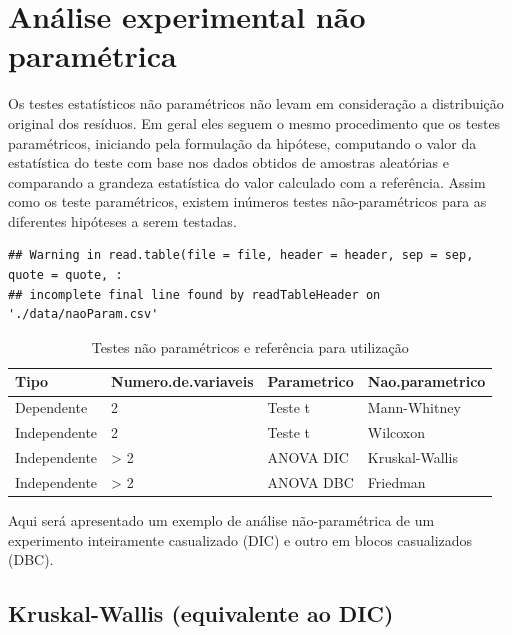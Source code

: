 \documentclass[
]{article}
\begin{document}
\hypertarget{anuxe1lise-experimental-nuxe3o-paramuxe9trica}{%
\section{Análise experimental não paramétrica}\label{anuxe1lise-experimental-nuxe3o-paramuxe9trica}}

Os testes estatísticos não paramétricos não levam em consideração a distribuição original dos resíduos. Em geral eles seguem o mesmo procedimento que os testes paramétricos, iniciando pela formulação da hipótese, computando o valor da estatística do teste com base nos dados obtidos de amostras aleatórias e comparando a grandeza estatística do valor calculado com a referência. Assim como os teste paramétricos, existem inúmeros testes não-paramétricos para as diferentes hipóteses a serem testadas.

\begin{verbatim}
## Warning in read.table(file = file, header = header, sep = sep, quote = quote, :
## incomplete final line found by readTableHeader on './data/naoParam.csv'
\end{verbatim}

\begin{table}

\caption{\label{tab:unnamed-chunk-173}Testes não paramétricos e referência para utilização}
\centering
\begin{tabular}[t]{l|l|l|l}
\hline
Tipo & Numero.de.variaveis & Parametrico & Nao.parametrico\\
\hline
Dependente & 2 & Teste t & Mann-Whitney\\
\hline
Independente & 2 & Teste t & Wilcoxon\\
\hline
Independente & > 2 & ANOVA DIC & Kruskal-Wallis\\
\hline
Independente & > 2 & ANOVA DBC & Friedman\\
\hline
\end{tabular}
\end{table}

Aqui será apresentado um exemplo de análise não-paramétrica de um experimento inteiramente casualizado (DIC) e outro em blocos casualizados (DBC).

\hypertarget{kruskal-wallis-equivalente-ao-dic}{%
\subsection{Kruskal-Wallis (equivalente ao DIC)}\label{kruskal-wallis-equivalente-ao-dic}}
\end{document}
